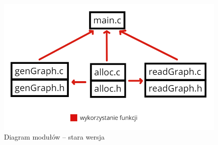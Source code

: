 \documentclass[10pt, a4paper]{report}
\begin{document}
    \begin{figure}[ht]
        \begin{center}
            \includegraphics[scale=0.35]{module_diagram_old.jpg}
            \caption{Diagram modułów -- stara wersja}
        \end{center}
    \end{figure}
\end{document}
